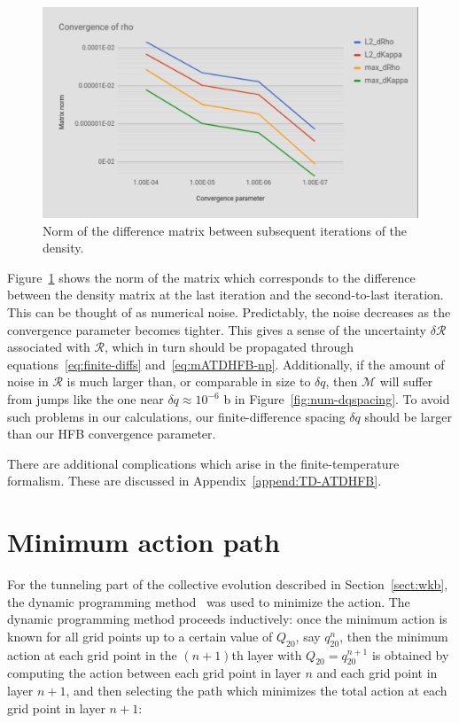 \begin{figure}
	\centering
	\includegraphics[width=0.7\linewidth]{TeX_files/Num-rho_conv}
	\caption[Norm of the difference matrix between subsequent iterations of the density]{Norm of the difference matrix between subsequent iterations of the density.}
	\label{fig:num-rhoconv}
\end{figure}

Figure~\ref{fig:num-rhoconv} shows the norm of the matrix which corresponds to the difference between the density matrix at the last iteration and the second-to-last iteration. This can be thought of as numerical noise. Predictably, the noise decreases as the convergence parameter becomes tighter. This gives a sense of the uncertainty $\delta \mathcal{R}$ associated with $\mathcal{R}$, which in turn should be propagated through equations~\eqref{eq:finite-diffs} and~\eqref{eq:mATDHFB-np}. Additionally, if the amount of noise in $\mathcal{R}$ is much larger than, or comparable in size to $\delta q$, then $\mathcal{M}$ will suffer from jumps like the one near $\delta q \approx 10^{-6}$ b in Figure~\ref{fig:num-dqspacing}. To avoid such problems in our calculations, our finite-difference spacing $\delta q$ should be larger than our HFB convergence parameter.

There are additional complications which arise in the finite-temperature formalism. These are discussed in Appendix~\ref{append:TD-ATDHFB}.

\section{Minimum action path}
For the tunneling part of the collective evolution described in Section~\ref{sect:wkb}, the dynamic programming method~\cite{Baran1981} was used to minimize the action. The dynamic programming method proceeds inductively: once the minimum action is known for all grid points up to a certain value of $Q_{20}$, say $q_{20}^n$, then the minimum action at each grid point in the $(n+1)$th layer with $Q_{20}=q_{20}^{n+1}$ is obtained by computing the action between each grid point in layer $n$ and each grid point in layer $n+1$, and then selecting the path which minimizes the total action at each grid point in layer $n+1$:

